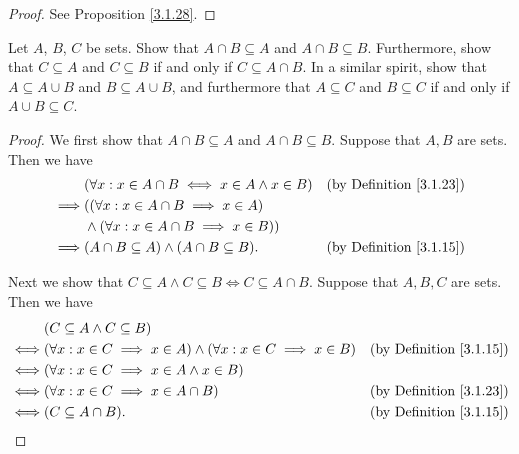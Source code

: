 \begin{proof}
    See Proposition \ref{3.1.28}.
\end{proof}

\begin{exercise}\label{ex 3.1.7}
    Let \(A\), \(B\), \(C\) be sets.
    Show that \(A \cap B \subseteq A\) and \(A \cap B \subseteq B\).
    Furthermore, show that \(C \subseteq A\) and \(C \subseteq B\) if and only if \(C \subseteq A \cap B\).
    In a similar spirit, show that \(A \subseteq A \cup B\) and \(B \subseteq A \cup B\), and furthermore that \(A \subseteq C\) and \(B \subseteq C\) if and only if \(A \cup B \subseteq C\).
\end{exercise}

\begin{proof}
    We first show that \(A \cap B \subseteq A\) and \(A \cap B \subseteq B\).
    Suppose that \(A, B\) are sets.
    Then we have
    \begin{align*}
                 & (\forall x : x \in A \cap B \iff x \in A \land x \in B) & \text{(by Definition \ref{3.1.23})} \\
        \implies & ((\forall x : x \in A \cap B \implies x \in A)                                                \\
                 & \land (\forall x : x \in A \cap B \implies x \in B))                                          \\
        \implies & (A \cap B \subseteq A) \land (A \cap B \subseteq B).    & \text{(by Definition \ref{3.1.15})}
    \end{align*}

    Next we show that \(C \subseteq A \land C \subseteq B \iff C \subseteq A \cap B\).
    Suppose that \(A, B, C\) are sets.
    Then we have
    \begin{align*}
             & (C \subseteq A \land C \subseteq B)                                                                                       \\
        \iff & (\forall x : x \in C \implies x \in A) \land (\forall x : x \in C \implies x \in B) & \text{(by Definition \ref{3.1.15})} \\
        \iff & (\forall x : x \in C \implies x \in A \land x \in B)                                                                      \\
        \iff & (\forall x : x \in C \implies x \in A \cap B)                                       & \text{(by Definition \ref{3.1.23})} \\
        \iff & (C \subseteq A \cap B).                                                             & \text{(by Definition \ref{3.1.15})}
    \end{align*}


\end{proof}
